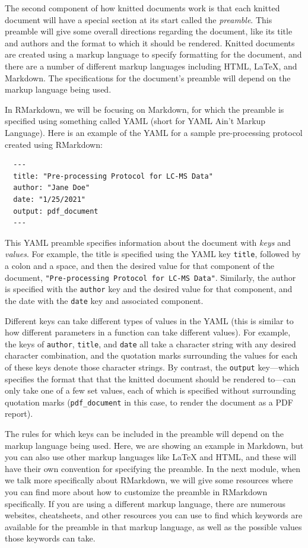 \documentclass[]{tufte-book}
\begin{document}
The second component of how knitted documents work is that each knitted document
will have a special section at its start called the \emph{preamble}. This preamble
will give some overall directions regarding the document, like its title and
authors and the format to which it should be rendered. Knitted documents are
created using a markup language to specify formatting for the document, and
there are a number of different markup languages including HTML, LaTeX, and
Markdown. The specifications for the document's preamble will depend on the
markup language being used.

In RMarkdown, we will be focusing on Markdown, for which the preamble is
specified using something called YAML (short for YAML Ain't Markup Language).
Here is an example of the YAML for a sample pre-processing protocol created
using RMarkdown:

\begin{verbatim}
  ---
  title: "Pre-processing Protocol for LC-MS Data"
  author: "Jane Doe"
  date: "1/25/2021"
  output: pdf_document
  ---
\end{verbatim}

This YAML preamble specifies information about the document with \emph{keys} and
\emph{values}. For example, the title is specified using the YAML key \texttt{title},
followed by a colon and a space, and then the desired value for that
component of the document, \texttt{"Pre-processing\ Protocol\ for\ LC-MS\ Data"}.
Similarly, the author is specified with the \texttt{author} key and the desired
value for that component, and the date with the \texttt{date} key and associated
component.

Different keys can take different types of values in the YAML
(this is similar to how different parameters in a function can take different values). For example, the keys of \texttt{author}, \texttt{title}, and \texttt{date} all take
a character string with any desired character combination, and the quotation
marks surrounding the values for each of these keys denote those character strings. By contrast, the \texttt{output} key---which specifies the format that
that the knitted document should be rendered to---can only take one of a
few set values, each of which is specified without surrounding
quotation marks (\texttt{pdf\_document} in this case, to render the document
as a PDF report).

The rules for which keys can be included in the preamble will depend on the
markup language being used. Here, we are showing an example in Markdown, but you
can also use other markup languages like LaTeX and HTML, and these will have
their own convention for specifying the preamble. In the next module, when we
talk more specifically about RMarkdown, we will give some resources where you
can find more about how to customize the preamble in RMarkdown specifically. If
you are using a different markup language, there are numerous websites,
cheatsheets, and other resources you can use to find which keywords are
available for the preamble in that markup language, as well as the possible
values those keywords can take.
\end{document}
